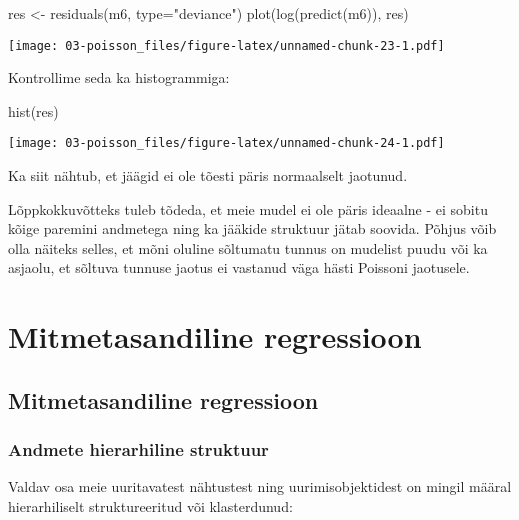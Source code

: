 \documentclass[
]{book}
\newenvironment{Shaded}{\begin{snugshade}}{\end{snugshade}}
\newcommand{\AttributeTok}[1]{\textcolor[rgb]{0.77,0.63,0.00}{#1}}
\newcommand{\FunctionTok}[1]{\textcolor[rgb]{0.00,0.00,0.00}{#1}}
\newcommand{\NormalTok}[1]{#1}
\newcommand{\OtherTok}[1]{\textcolor[rgb]{0.56,0.35,0.01}{#1}}
\newcommand{\StringTok}[1]{\textcolor[rgb]{0.31,0.60,0.02}{#1}}
\begin{document}
\begin{Shaded}
\begin{Highlighting}[]
\NormalTok{res }\OtherTok{\textless{}{-}} \FunctionTok{residuals}\NormalTok{(m6, }\AttributeTok{type=}\StringTok{"deviance"}\NormalTok{)}
\FunctionTok{plot}\NormalTok{(}\FunctionTok{log}\NormalTok{(}\FunctionTok{predict}\NormalTok{(m6)), res)}
\end{Highlighting}
\end{Shaded}

\texttt{[image: 03-poisson\_files/figure-latex/unnamed-chunk-23-1.pdf]}

Kontrollime seda ka histogrammiga:

\begin{Shaded}
\begin{Highlighting}[]
\FunctionTok{hist}\NormalTok{(res)}
\end{Highlighting}
\end{Shaded}

\texttt{[image: 03-poisson\_files/figure-latex/unnamed-chunk-24-1.pdf]}

Ka siit nähtub, et jäägid ei ole tõesti päris normaalselt jaotunud.

Lõppkokkuvõtteks tuleb tõdeda, et meie mudel ei ole päris ideaalne - ei sobitu kõige paremini andmetega ning ka jääkide struktuur jätab soovida. Põhjus võib olla näiteks selles, et mõni oluline sõltumatu tunnus on mudelist puudu või ka asjaolu, et sõltuva tunnuse jaotus ei vastanud väga hästi Poissoni jaotusele.

\hypertarget{part-mitmetasandiline-regressioon}{%
\part{Mitmetasandiline regressioon}\label{part-mitmetasandiline-regressioon}}

\hypertarget{mitmetasandiline-regressioon}{%
\chapter{Mitmetasandiline regressioon}\label{mitmetasandiline-regressioon}}

\hypertarget{andmete-hierarhiline-struktuur}{%
\section{Andmete hierarhiline struktuur}\label{andmete-hierarhiline-struktuur}}

Valdav osa meie uuritavatest nähtustest ning uurimisobjektidest on mingil määral hierarhiliselt struktureeritud või klasterdunud:
\end{document}
